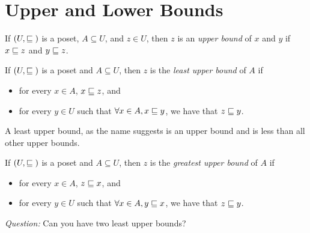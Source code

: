 \section{Upper and Lower Bounds}
\begin{definition}
  If $(U, \sqsubseteq{})$ is a poset, $A \subseteq U$, and $z \in U$, then $z$ is an \emph{upper bound} of $x$ and $y$ if $x \sqsubseteq{} z$ and $y \sqsubseteq{} z$.
\end{definition}

\begin{definition}
  If $(U, \sqsubseteq{})$ is a poset and $A \subseteq U$, then $z$ is the \emph{least upper bound} of $A$ if
  \begin{itemize}
  \item for every $x \in A$, $x \sqsubseteq{} z$, and
  \item for every $y \in U$ such that $\forall x \in A, x \sqsubseteq{} y$, we have that $z \sqsubseteq{} y$.
  \end{itemize}
\end{definition}

A least upper bound, as the name suggests is an upper bound and is less than all other upper bounds.

\begin{definition}
  If $(U, \sqsubseteq{})$ is a poset and $A \subseteq U$, then $z$ is the \emph{greatest upper bound} of $A$ if
  \begin{itemize}
  \item for every $x \in A$, $z \sqsubseteq{} x$, and
  \item for every $y \in U$ such that $\forall x \in A, y \sqsubseteq{} x$, we have that $z \sqsubseteq{} y$.
  \end{itemize}
\end{definition}

\emph{Question:} Can you have two least upper bounds?

